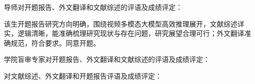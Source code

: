 \cleardoublepage

{
    \bfseries

    {
        \noindent 导师对开题报告、外文翻译和文献综述的评语及成绩评定：
    }

    \vspace{10mm}

    该生开题报告研究方向明确，围绕视频多模态大模型高效推理展开，文献综述详实，逻辑清晰，能准确梳理研究现状与存在问题，研究展望合理可行；外文翻译准确规范，符合要求。同意开题。

    \vspace{10mm}

    \thesisproposaleval[][][]

    \signature{导师签名}

    {
        \noindent 学院盲审专家对开题报告、外文翻译和文献综述的评语及成绩评定：
    }


    \mbox{} \vfill
    \thesisproposaleval
    \signature{开题报告审核负责人（签名/签章）}
}
{
    \bfseries

    {
        \noindent 对文献综述、外文翻译和开题报告评语及成绩评定：
    }


    \mbox{} \vfill
    \thesisproposaleval
    \signature{开题报告答辩小组负责人（签名）}
}

